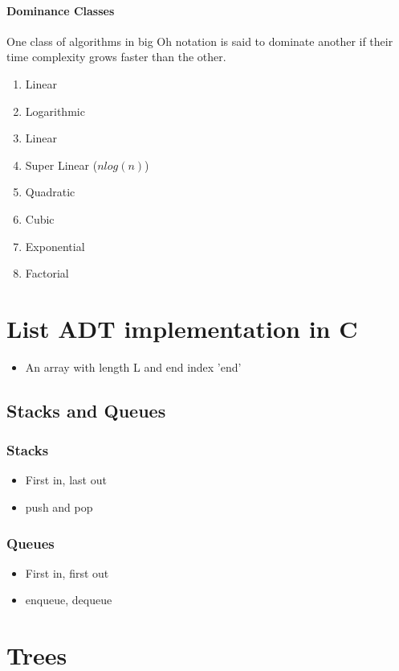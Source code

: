 \documentclass[a4paper,12pt]{report}
\begin{document}
\subsubsection{Dominance Classes}
One class of algorithms in big Oh notation is said to dominate another if their time complexity grows faster than the other.
\begin{enumerate}
\item Linear
\item Logarithmic
\item Linear
\item Super Linear ($n log(n)$)
\item Quadratic
\item Cubic
\item Exponential
\item Factorial
\end{enumerate}
	

\chapter{List ADT implementation in C}
\begin{itemize}
\item An array with length L and end index 'end'
\end{itemize}

\section{Stacks and Queues}
\subsection{Stacks}
\begin{itemize}
\item First in, last out
\item push and pop
\end{itemize}
\subsection{Queues}
\begin{itemize}
\item First in, first out
\item enqueue, dequeue
\end{itemize}

\chapter{Trees}
\end{document}
